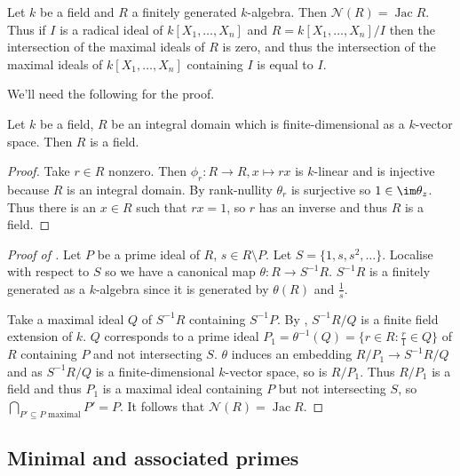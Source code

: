 \documentclass[a4paper]{article}
\newcommand{\nilrad}[1]{\mathcal{N}({#1})} %
\DeclareMathOperator{\jac}{Jac} %
\begin{document}
\begin{theorem}
  \label{thm:nilradical equals to Jacobson radical}
  Let \(k\) be a field and \(R\) a finitely generated \(k\)-algebra. Then \(\nilrad R = \jac R\). Thus if \(I\) is a radical ideal of \(k[X_1, \dots, X_n]\) and \(R = k[X_1, \dots, X_n]/I\) then the intersection of the maximal ideals of \(R\) is zero, and thus the intersection of the maximal ideals of \(k[X_1, \dots, X_n]\) containing \(I\) is equal to \(I\).
\end{theorem}

We'll need the following for the proof.
\begin{lemma}
  Let \(k\) be a field, \(R\) be an integral domain which is finite-dimensional as a \(k\)-vector space. Then \(R\) is a field.
\end{lemma}

\begin{proof}
  Take \(r \in R\) nonzero. Then \(\phi_r: R \to R, x \mapsto rx\) is \(k\)-linear and is injective because \(R\) is an integral domain. By rank-nullity \(\theta_r\) is surjective so \(1 \in \im \theta_z\). Thus there is an \(x \in R\) such that \(rx = 1\), so \(r\) has an inverse and thus \(R\) is a field.
\end{proof}

\begin{proof}[Proof of ]
  Let \(P\) be a prime ideal of \(R\), \(s \in R \setminus P\). Let \(S = \{1, s, s^2, \dots \}\). Localise with respect to \(S\) so we have a canonical map \(\theta: R \to S^{-1}R\). \(S^{-1}R\) is a finitely generated as a \(k\)-algebra since it is generated by \(\theta(R)\) and \(\frac{1}{s}\).

  Take a maximal ideal \(Q\) of \(S^{-1}R\) containing \(S^{-1}P\). By , \(S^{-1}R/Q\) is a finite field extension of \(k\). \(Q\) corresponds to a prime ideal \(P_1 = \theta^{-1}(Q) = \{r \in R: \frac{r}{1} \in Q\}\) of \(R\) containing \(P\) and not intersecting \(S\). \(\theta\) induces an embedding \(R/P_1 \to S^{-1}R/Q\) and as \(S^{-1}R/Q\) is a finite-dimensional \(k\)-vector space, so is \(R/P_1\). Thus \(R/P_1\) is a field and thus \(P_1\) is a maximal ideal containing \(P\) but not intersecting \(S\), so \(\bigcap_{P' \subseteq P \text{ maximal}} P' = P\). It follows that \(\nilrad R = \jac R\).
\end{proof}

\subsection{Minimal and associated primes}
\end{document}
